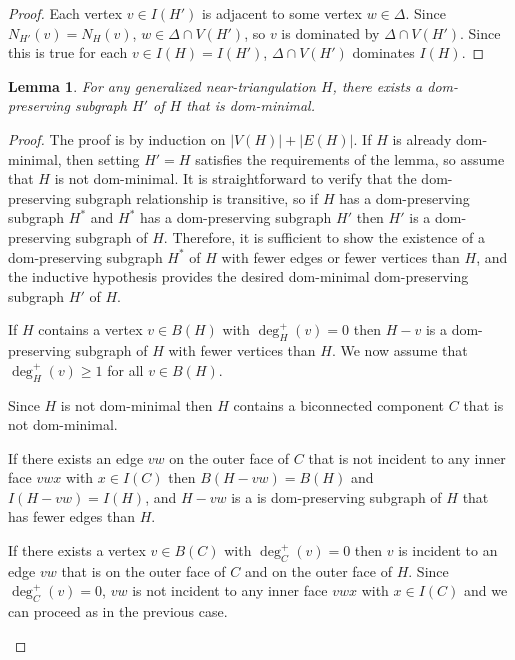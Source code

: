 \documentclass[12pt]{article}
\newtheorem{lem}{Lemma}
\begin{document}
\begin{proof}
  Each vertex $v\in I(H')$ is adjacent to some vertex $w\in \Delta$.  Since $N_{H'}(v)=N_H(v)$, $w\in\Delta\cap V(H')$, so $v$ is dominated by $\Delta\cap V(H')$.  Since this is true for each $v\in I(H)=I(H')$, $\Delta\cap V(H')$ dominates $I(H)$.
\end{proof}

\begin{lem}\label{dom-minimal}
  For any generalized near-triangulation $H$, there exists a dom-preserving subgraph $H'$ of $H$ that is dom-minimal.
\end{lem}

\begin{proof}
  The proof is by induction on $|V(H)|+|E(H)|$.  If $H$ is already dom-minimal, then setting $H'=H$ satisfies the requirements of the lemma, so assume that $H$ is not dom-minimal.  It is straightforward to verify that the dom-preserving subgraph relationship is transitive, so if $H$ has a dom-preserving subgraph $H^*$ and $H^*$ has a dom-preserving subgraph $H'$ then $H'$ is a dom-preserving subgraph of $H$.  Therefore, it is sufficient to show the existence of a dom-preserving subgraph $H^*$ of $H$ with fewer edges or fewer vertices than $H$, and the inductive hypothesis provides the desired dom-minimal dom-preserving subgraph $H'$ of $H$.

  If $H$ contains a vertex $v\in B(H)$ with $\deg^+_H(v)=0$ then $H-v$ is a dom-preserving subgraph of $H$ with fewer vertices than $H$.  We now assume that $\deg^+_H(v)\ge 1$ for all $v\in B(H)$.

  Since $H$ is not dom-minimal then $H$ contains a biconnected component $C$ that is not dom-minimal.
  \begin{compactenum}
    \item If there exists an edge $vw$ on the outer face of $C$ that is not incident to any inner face $vwx$ with $x\in I(C)$ then $B(H-vw)=B(H)$ and $I(H-vw)=I(H)$, and $H-vw$ is a is dom-preserving subgraph of $H$ that has fewer edges than $H$.

    \item If there exists a vertex $v\in B(C)$ with $\deg^+_C(v)=0$ then $v$ is incident to an edge $vw$ that is on the outer face of $C$ and on the outer face of $H$. Since $\deg^+_C(v)=0$, $vw$ is not incident to any inner face $vwx$ with $x\in I(C)$ and we can proceed as in the previous case. \qedhere
  \end{compactenum}
\end{proof}
\end{document}
